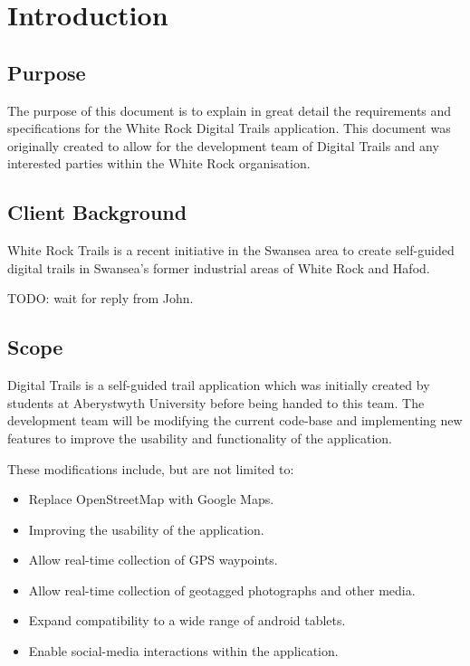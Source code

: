 \documentclass[11pt,a4paper]{article}
\begin{document}


\tableofcontents

\section{Introduction}
\subsection{Purpose}
\label{sec:purpose}
The purpose of this document is to explain in great detail the requirements and specifications for the White Rock Digital Trails application. This document was originally created to allow for the development team of Digital Trails and any interested parties within the White Rock organisation.

\subsection{Client Background}
\label{sec:client-background}
White Rock Trails is a recent initiative in the Swansea area to create self-guided digital trails in Swansea's former industrial areas of White Rock and Hafod. 

TODO: wait for reply from John.

\subsection{Scope}
\label{sec:scope}
Digital Trails is a self-guided trail application which was initially created by students at Aberystwyth University before being handed to this team. The development team will be modifying the current code-base and implementing new features to improve the usability and functionality of the application.

These modifications include, but are not limited to:
\begin{itemize}
\item Replace OpenStreetMap with Google Maps.
\item Improving the usability of the application.
\item Allow real-time collection of GPS waypoints.
\item Allow real-time collection of geotagged photographs and other media.
\item Expand compatibility to a wide range of android tablets.
\item Enable social-media interactions within the application.
\end{itemize}
\end{document}
